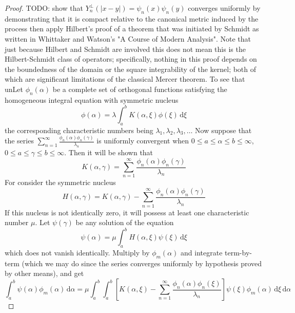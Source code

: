\documentclass{article}
\begin{document}
\begin{proof}
TODO: show that $Y^{\perp}_n (| x - y |) = \psi_n (x) \psi_n (y)$ converges
uniformly by demonstrating that it is compact relative to the canonical
metric induced by the process then apply Hilbert's proof of a theorem that
was initiated by Schmidt as written in
Whittaker and Watson's "A Course of Modern Analysis". Note that just
because Hilbert and Schmidt are involved this does not mean this is the
Hilbert-Schmidt class of operators; specifically, nothing in this proof
depends on the boundedness of the domain or the square integrability of the
kernel; both of which are significant limitations of the classical Mercer
theorem. To see that unLet $\phi_n (\alpha)$ be a complete set of orthogonal
functions satisfying the homogeneous integral equation with symmetric
nucleus
\begin{equation}
\phi (\alpha) = \lambda \int_a^b K (\alpha, \xi) \phi (\xi) \, \mathrm{d} \xi
\end{equation}
the corresponding characteristic numbers being $\lambda_1, \lambda_2,
\lambda_3, \ldots$ Now suppose that the series $\sum_{n = 1}^{\infty}
\frac{\phi_n (\alpha) \phi_n (\gamma)}{\lambda_n}$ is uniformly convergent
when $0 \leqslant a \leq \alpha \leq b \leqslant \infty$, $0 \leqslant a
\leq \gamma \leq b \leqslant \infty$. Then it will be shown that
\begin{equation}
K (\alpha, \gamma) = \sum_{n = 1}^{\infty} \frac{\phi_n (\alpha) \phi_n
(\gamma)}{\lambda_n}
\end{equation}
For consider the symmetric nucleus
\begin{equation}
H (\alpha, \gamma) = K (\alpha, \gamma) - \sum_{n = 1}^{\infty}
\frac{\phi_n (\alpha) \phi_n (\gamma)}{\lambda_n}
\end{equation}
If this nucleus is not identically zero, it will possess at least one
characteristic number $\mu$. Let $\psi (\gamma)$ be any solution of the
equation
\begin{equation}
\psi (\alpha) = \mu \int_a^b H (\alpha, \xi) \psi (\xi) \, \mathrm{d} \xi
\end{equation}
which does not vanish identically. Multiply by $\phi_m (\alpha)$ and
integrate term-by-term (which we may do since the series converges uniformly
by hypothesis proved by other means), and get
\begin{equation}
\int_a^b \psi (\alpha) \phi_m (\alpha) \, \mathrm{d} \alpha = \mu \int_a^b \int_a^b
\left[ K (\alpha, \xi) - \sum_{n = 1}^{\infty} \frac{\phi_n (\alpha)
\phi_n (\xi)}{\lambda_n} \right] \psi (\xi) \phi_m (\alpha) \, \mathrm{d} \xi \, \mathrm{d} \alpha

\end{equation}
\end{proof}
\end{document}
